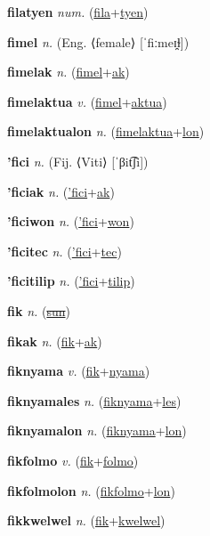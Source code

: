 \textbf{\hypertarget{filatyen}{filatyen}} \textit{num.} (\hyperlink{fila}{fila}+\allowbreak \hyperlink{tyen}{tyen})


\textbf{\hypertarget{fimel}{fimel}} \textit{n.} (Eng. ⟨female⟩ [ˈfiːmeɪ̯ɫ])


\textbf{\hypertarget{fimelak}{fimelak}} \textit{n.} (\hyperlink{fimel}{fimel}+\allowbreak \hyperlink{ak}{ak})


\textbf{\hypertarget{fimelaktua}{fimelaktua}} \textit{v.} (\hyperlink{fimel}{fimel}+\allowbreak \hyperlink{aktua}{aktua})


\textbf{\hypertarget{fimelaktualon}{fimelaktualon}} \textit{n.} (\hyperlink{fimelaktua}{fimelaktua}+\allowbreak \hyperlink{lon}{lon})


\textbf{\hypertarget{'fici}{'fici}} \textit{n.} (Fij. ⟨Viti⟩ [ˈβit͡ʃi])


\textbf{\hypertarget{'ficiak}{'ficiak}} \textit{n.} (\hyperlink{'fici}{'fici}+\allowbreak \hyperlink{ak}{ak})


\textbf{\hypertarget{'ficiwon}{'ficiwon}} \textit{n.} (\hyperlink{'fici}{'fici}+\allowbreak \hyperlink{won}{won})


\textbf{\hypertarget{'ficitec}{'ficitec}} \textit{n.} (\hyperlink{'fici}{'fici}+\allowbreak \hyperlink{tec}{tec})


\textbf{\hypertarget{'ficitilip}{'ficitilip}} \textit{n.} (\hyperlink{'fici}{'fici}+\allowbreak \hyperlink{tilip}{tilip})


\textbf{\hypertarget{fik}{fik}} \textit{n.} (\hyperlink{sun}{\sout{sun}})


\textbf{\hypertarget{fikak}{fikak}} \textit{n.} (\hyperlink{fik}{fik}+\allowbreak \hyperlink{ak}{ak})


\textbf{\hypertarget{fiknyama}{fiknyama}} \textit{v.} (\hyperlink{fik}{fik}+\allowbreak \hyperlink{nyama}{nyama})


\textbf{\hypertarget{fiknyamales}{fiknyamales}} \textit{n.} (\hyperlink{fiknyama}{fiknyama}+\allowbreak \hyperlink{les}{les})


\textbf{\hypertarget{fiknyamalon}{fiknyamalon}} \textit{n.} (\hyperlink{fiknyama}{fiknyama}+\allowbreak \hyperlink{lon}{lon})


\textbf{\hypertarget{fikfolmo}{fikfolmo}} \textit{v.} (\hyperlink{fik}{fik}+\allowbreak \hyperlink{folmo}{folmo})


\textbf{\hypertarget{fikfolmolon}{fikfolmolon}} \textit{n.} (\hyperlink{fikfolmo}{fikfolmo}+\allowbreak \hyperlink{lon}{lon})


\textbf{\hypertarget{fikkwelwel}{fikkwelwel}} \textit{n.} (\hyperlink{fik}{fik}+\allowbreak \hyperlink{kwelwel}{kwelwel})


